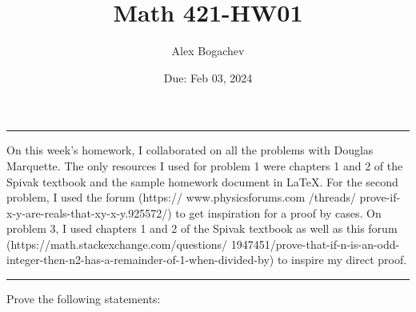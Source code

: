 \documentclass[10pt, oneside]{article}
\title{Math 421-HW01}
\author{Alex Bogachev}
\date{Due: Feb 03, 2024}
\begin{document}
\maketitle 

\hrule
\vspace{20pt}

    On this week's homework, I collaborated on all the problems with Douglas Marquette. The only resources I used for problem 1 were chapters  1 and 2 of the Spivak textbook and the sample homework document in \LaTeX. For the second problem, I used the forum (https://
    www.physicsforums.com
    /threads/
    prove-if-x-y-are-reals-that-xy-x-y.925572/) to get inspiration for a proof by cases. On problem 3, I used chapters 1 and 2 of the Spivak textbook as well as this forum (https://math.stackexchange.com/questions/
    1947451/prove-that-if-n-is-an-odd-integer-then-n2-has-a-remainder-of-1-when-divided-by) to inspire my direct proof.
    
\vspace{20pt}
\hrule
\vspace{20pt}



Prove the following statements: 
\end{document}
